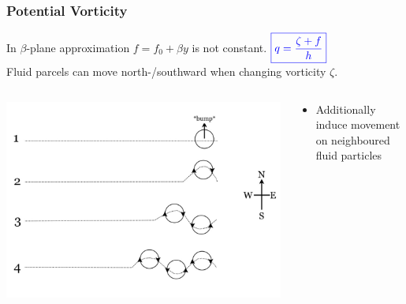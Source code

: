 \documentclass[12pt]{beamer}
\begin{document}
\begin{frame}
\frametitle{Potential Vorticity}
In $\beta$-plane approximation $f=f_0+\beta y$ is not constant. \hfill $\color{blue}\boxed{q=\frac{\zeta+f}{h}}$\\
\vspace{0.5cm}
Fluid parcels can move north-/southward when changing vorticity $\zeta$.
\begin{columns}
    \begin{column}{0.55\textwidth}
        \includegraphics[width=\linewidth]{beta_plane}
    \end{column}
    \begin{column}{0.45\textwidth}
       \begin{itemize}
	\item Additionally induce movement on neighboured fluid particles
	\end{itemize}
    \end{column}
\end{columns}
\end{frame}
\end{document}
